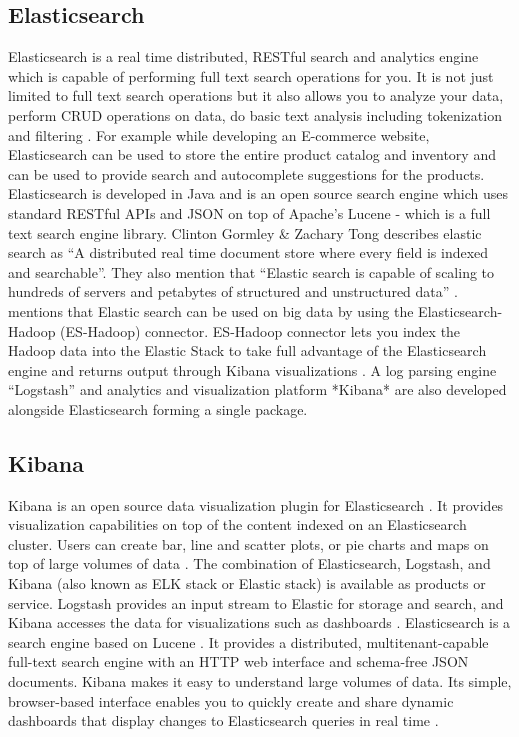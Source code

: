 \subsection{Elasticsearch}

    Elasticsearch \cite{www-elasticsearch} is a real time
    distributed, RESTful search and analytics engine which is capable
    of performing full text search operations for you. It is not just
    limited to full text search operations but it also allows you to
    analyze your data, perform CRUD operations on data, do basic text
    analysis including tokenization and
    filtering \cite{www-elasticsearch-intro}. For example while
    developing an E-commerce website, Elasticsearch can be used to
    store the entire product catalog and inventory and can be used to
    provide search and autocomplete suggestions for the
    products. Elasticsearch is developed in Java and is an open source
    search engine which uses standard RESTful APIs and JSON on
    top of Apache's Lucene - which is a full text search engine
    library. Clinton Gormley \& Zachary Tong \cite{elasticsearch-book}
    describes elastic search as ``A distributed real time document
    store where every field is indexed and searchable''. They also
    mention that ``Elastic search is capable of scaling to hundreds of
    servers and petabytes of structured and unstructured
    data'' \cite{www-elasticsearch-hadoop}. mentions that Elastic
    search can be used on big data by using the Elasticsearch-Hadoop
    (ES-Hadoop) connector. ES-Hadoop connector lets you index the
    Hadoop data into the Elastic Stack to take full advantage of the
    Elasticsearch engine and returns output through Kibana
    visualizations \cite{www-wikipedia-elasticsearch}. A log parsing
    engine ``Logstash'' and analytics and visualization platform
    *Kibana* are also developed alongside Elasticsearch forming a
    single package.
    
\subsection{Kibana}

    Kibana is an open source data visualization plugin for
    Elasticsearch \cite{www-kibana-1}. It provides visualization
    capabilities on top of the content indexed on an Elasticsearch
    cluster. Users can create bar, line and scatter plots, or pie
    charts and maps on top of large volumes of
    data \cite{www-kibana-2}. The combination of Elasticsearch,
    Logstash, and Kibana (also known as ELK stack or Elastic stack) is
    available as products or service. Logstash provides an input
    stream to Elastic for storage and search, and Kibana accesses the
    data for visualizations such as dashboards \cite{www-kibana-3}.
    Elasticsearch is a search engine based on
    Lucene \cite{www-kibana-4}. It provides a distributed,
    multitenant-capable full-text search engine with an HTTP web
    interface and schema-free JSON documents. Kibana makes it easy to
    understand large volumes of data. Its simple, browser-based
    interface enables you to quickly create and share dynamic
    dashboards that display changes to Elasticsearch queries in real
    time \cite{www-kibana-5} \cite{www-kibana-6}.

